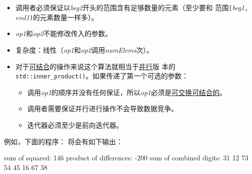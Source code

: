 \begin{itemize}
    \item 调用者必须保证以\emph{beg2}开头的范围含有足够数量的元素（至少要和
    范围\texttt{[}\emph{beg1}\texttt{, }\emph{end1}\texttt{)}的元素数量一样多）。
    \item \emph{op1}和\emph{op2}不能修改传入的参数。
    \item 复杂度：线性（\emph{op1}和\emph{op2}调用\emph{numElems}次）。
    \item 对于\hyperref[ch22.6.1.1]{可结合}的操作来说这个算法就相当于\hyperref[ch22]{并行}版
    本的\texttt{std::inner\_product()}。如果传递了第一个可选的参数：
    \begin{itemize}
        \item 调用\emph{op1}的顺序并没有任何保证，所以\emph{op1}必须是\hyperref[ch22.6.1.1]{可交换可结合的}。
        \item 调用者需要保证并行进行操作不会导致数据竞争。
        \item 迭代器必须至少是前向迭代器。
    \end{itemize}
\end{itemize}
例如，下面的程序：
将会有如下输出：
\begin{blacklisting}
    sum of squared:         146
    product of differences: -200
    sum of combined digits: 31 12 73 54 45 16 67 38
\end{blacklisting}

